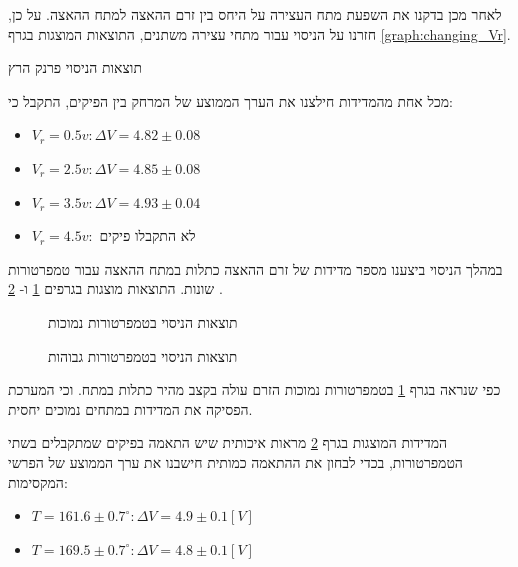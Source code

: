 \documentclass{article}
\begin{document}
לאחר מכן בדקנו את השפעת מתח העצירה על היחס בין זרם ההאצה למתח ההאצה.
על כן, חזרנו על הניסוי עבור מתחי עצירה משתנים, התוצאות המוצגות בגרף
\ref{graph:changing_Vr}.

\begin{graph}[H]
	\begin{center}
	\resizebox{\textwidth}{!}{}
	\end{center}
	\caption{תוצאות הניסוי פרנק הרץ}
	\label{graph:changing_Vr}
\end{graph}

מכל אחת מהמדידות חילצנו את הערך הממוצע של המרחק בין הפיקים, התקבל כי:
\begin{itemize}
    \item $V_r=0.5v: \Delta V =4.82 \pm 0.08$
    \item $V_r=2.5v: \Delta V =4.85 \pm 0.08$
    \item $V_r=3.5v: \Delta V =4.93 \pm 0.04$
    \item $V_r=4.5v:$ לא התקבלו פיקים
\end{itemize}


במהלך הניסוי ביצענו מספר מדידות של זרם ההאצה כתלות במתח ההאצה עבור טמפרטורות שונות.
התוצאות מוצגות בגרפים
\ref{graph:Changing_temp_0-10v}
ו-
\ref{graph:Changing_temp_0-30v}
.

\begin{graph}[H]
    \begin{subfigure}[b]{\textwidth}
    	\centering
    	\resizebox{0.95\textwidth}{!}{}
    	\caption{תוצאות הניסוי בטמפרטורות נמוכות}
    	\label{graph:Changing_temp_0-10v}
    \end{subfigure}
    \hfill
    \begin{subfigure}[b]{\textwidth}
    	\centering
    	\resizebox{0.95\textwidth}{!}{}
    	\caption{תוצאות הניסוי בטמפרטורות גבוהות}
    	\label{graph:Changing_temp_0-30v}
    \end{subfigure}
    \label{graph:Changing_temp}
\end{graph}

כפי שנראה בגרף 
\ref{graph:Changing_temp_0-10v}
בטמפרטורות נמוכות הזרם עולה בקצב מהיר כתלות במתח. 
וכי המערכת הפסיקה את המדידות במתחים נמוכים יחסית.

המדידות המוצגות בגרף
\ref{graph:Changing_temp_0-30v}
מראות איכותית שיש התאמה בפיקים שמתקבלים בשתי הטמפרטורות, בכדי לבחון את ההתאמה כמותית חישבנו את ערך הממוצע של הפרשי המקסימות:
\begin{itemize}
    \item $T = 161.6 \pm 0.7 ^{\circ}:\Delta V = 4.9 \pm 0.1  [V]$ 
    \item $T = 169.5 \pm 0.7 ^{\circ}:\Delta V = 4.8 \pm 0.1  [V]$ 
\end{itemize}
\end{document}
